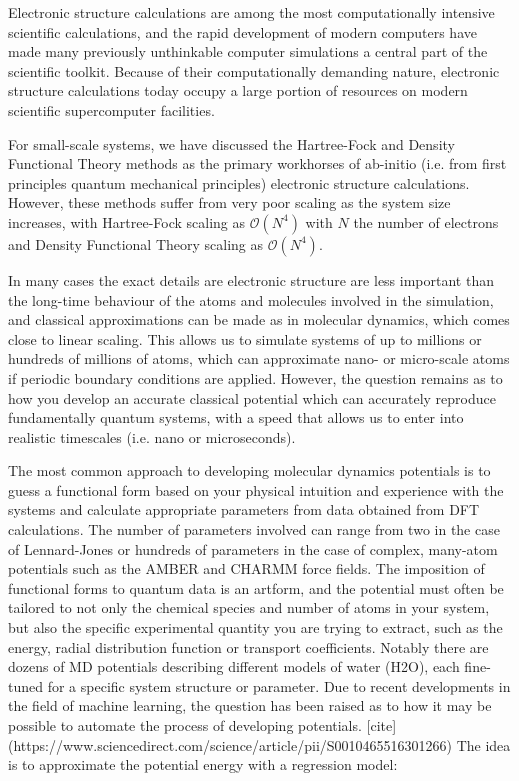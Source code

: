 Electronic structure calculations are among the most computationally
intensive scientific calculations, and the rapid development
of modern computers have made many previously unthinkable
computer simulations a central part of the scientific toolkit.
Because of their computationally demanding nature, electronic
structure calculations today occupy a large portion of resources
on modern scientific supercomputer facilities.
\par
For small-scale systems, we have discussed the Hartree-Fock
and Density Functional Theory methods as the primary workhorses
of ab-initio (i.e. from first principles quantum mechanical principles)
electronic structure calculations. However, these methods suffer
from very poor scaling as the system size increases, with Hartree-Fock
scaling as $\mathcal{O}(N^4)$ with $N$ the number of electrons
and Density Functional Theory scaling as $\mathcal{O}(N^4)$.
\par
In many cases the exact details are electronic structure
are less important than the long-time behaviour of the atoms
and molecules involved in the simulation, and classical approximations
can be made as in molecular dynamics, which comes close
to linear scaling. This allows us to simulate systems
of up to millions or hundreds of millions of atoms,
which can approximate nano- or micro-scale atoms if
periodic boundary conditions are applied.
However, the question remains as to how you develop an
accurate classical potential which can accurately reproduce
fundamentally quantum systems, with a speed that allows
us to enter into realistic timescales (i.e. nano or microseconds).
\par
The most common approach to developing molecular dynamics potentials
is to guess a functional form based on your physical intuition
and experience with the systems and calculate appropriate parameters
from data obtained from DFT calculations.
The number of parameters involved can range from two in the case
of Lennard-Jones or hundreds of parameters in the case
of complex, many-atom potentials such as the AMBER and CHARMM
force fields. The imposition of functional forms to quantum data
is an artform, and the potential must often be tailored to not
only the chemical species and number of atoms in your system,
but also the specific experimental quantity you are trying to extract,
such as the energy, radial distribution function or transport
coefficients. Notably there are dozens of MD potentials
describing different models of water (H2O), each fine-tuned
for a specific system structure or parameter.
\newline
\newline
Due to recent developments in the field of machine learning,
the question has been raised as to how it may be possible to
automate the process of developing potentials.
[cite](https://www.sciencedirect.com/science/article/pii/S0010465516301266)
The idea is to approximate the potential energy
with a regression model:

